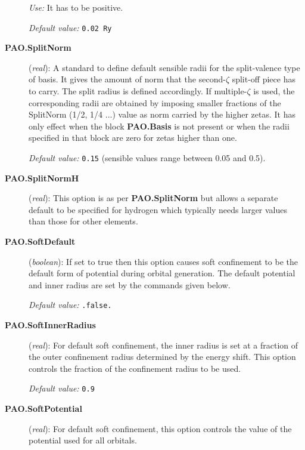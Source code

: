 \documentclass[11pt]{article}
\begin{document}
\begin{description}
{\it Use:} It has to be positive.

{\it Default value:} {\tt 0.02 Ry}


\item[{\bf PAO.SplitNorm}] ({\it real}): 
A standard to define default sensible
radii for the split-valence type of basis. It gives the amount of norm that
the second-$\zeta$ split-off piece has to carry. The split radius is defined
accordingly. If multiple-$\zeta$ 
is used, the corresponding radii are obtained
by imposing smaller fractions of the SplitNorm (1/2, 1/4 ...) value as
norm carried by the higher zetas. It has only effect when the block
{\bf PAO.Basis} is not present or when the radii
specified in that block are zero for zetas higher than one.

{\it Default value:} {\tt 0.15} (sensible values range between 0.05 and 0.5).

\item[{\bf PAO.SplitNormH}] ({\it real}):
This option is as per {\bf PAO.SplitNorm} but allows a separate
default to be
specified for hydrogen which typically needs larger values than those
for other
elements.


\item[{\bf PAO.SoftDefault}] ({\it boolean}):
If set to true then this option causes soft confinement to be the
default form
of potential during orbital generation. The default potential and
inner radius
are set by the commands given below.

{\it Default value:} {\tt .false.}

\item[{\bf PAO.SoftInnerRadius}] ({\it real}):
For default soft confinement, the inner radius is set at a fraction of
the outer
confinement radius determined by the energy shift. This option
controls the fraction
of the confinement radius to be used.

{\it Default value:} {\tt 0.9}

\item[{\bf PAO.SoftPotential}] ({\it real}):
For default soft confinement, this option controls the value of the
potential used
for all orbitals.


\end{description}
\end{document}

